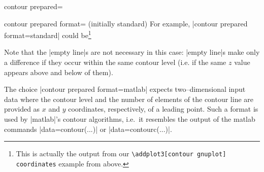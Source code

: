 {{\begin{plottype}[/pgfplots]{contour prepared=\textcolor{black}{}}
\begin{pgfplotskey}{contour prepared format= (initially standard)}
	For example, |contour prepared format=standard| could be\footnote{This is actually the output from our \texttt{\textbackslash addplot3[contour gnuplot] coordinates} example from above.}
\begin{codeexample}[]
\end{codeexample}
	\noindent Note that the |empty line|s are not necessary in this case: |empty line|s make only a difference if they occur within the same contour level (i.e. if the same $z$ value appears above and below of them).
		
		The choice |contour prepared format=matlab| expects two--dimensional input data where the contour level and the number of elements of the contour line are provided as $x$ and $y$ coordinates, respectively, of a leading point. Such a format is used by |matlab|'s contour algorithms, i.e.\ it resembles the output of the matlab commands |data=contour(...)| or |data=contourc(...)|.



\end{pgfplotskey}
\end{plottype}}}
